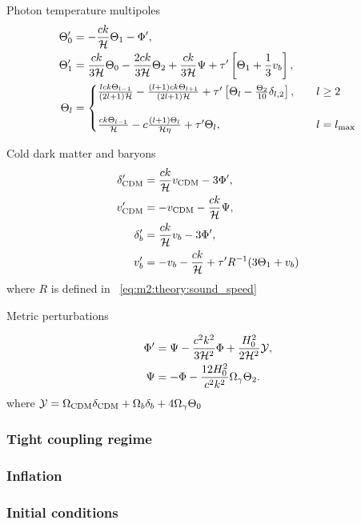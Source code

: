     
    Photon temperature multipoles
    \begin{subequations}\label{eq:m3:theory:photon_temp_multipoles}
        \begin{align}
            \Theta_0' &= -\frac{ck}{\mathcal{H}}\Theta_1-\Phi',\label{eq:m3:theory:photon_monopole}\\
            \Theta_1' &= \frac{ck}{3\mathcal{H}}\Theta_0 - \frac{2ck}{3\mathcal{H}}\Theta_2 +\frac{ck}{3\mathcal{H}}\Psi+\tau'\left[\Theta_1+\frac{1}{3}v_b\right],\label{eq:m3:theory:photon_dipole}\\
            \Theta_l &= \begin{cases}
                \frac{lck\Theta_{l-1}}{(2l+1)\mathcal{H}} -\frac{(l+1)ck\Theta_{l+1}}{(2l+1)\mathcal{H}} +\tau'\left[\Theta_l-\frac{\Theta_2}{10}\delta_{l,2}\right] , \quad &l\geq2\\
                \\
                \frac{ck\Theta_{l-1}}{\mathcal{H}} - c\frac{(l+1)\Theta_l}{\mathcal{H}\eta}+\tau'\Theta_l, &l=l_\mathrm{max}
            \end{cases}\label{eq:m3:theory:photon_multipole}
        \end{align}
    \end{subequations}


    
    Cold dark matter and baryons
    \begin{subequations}\label{eq:m3:theory:cdm_baryon_diffeqs}
        \begin{align}
            \delta'_{\text{CDM}} &= \frac{ck}{\mathcal{H}}v_{\text{CDM}}-3\Phi', \label{eq:m3:theory:delta_cdm}\\
            v'_{\text{CDM}} &= -v_{\text{CDM}}-\frac{ck}{\mathcal{H}}\Psi, \label{eq:m3:theory:v_cdm}\\
            \delta'_b &= \frac{ck}{\mathcal{H}}v_b - 3\Phi', \label{eq:m3:theory:delta_b}\\
            v'_b &= -v_b - \frac{ck}{\mathcal{H}} + \tau'R^{-1}(3\Theta_1+v_b) \label{eq:m3:theory:v_b}
        \end{align}
    \end{subequations}
    where $R$ is defined in ~\cref{eq:m2:theory:sound_speed}


    Metric perturbations

    \begin{subequations}\label{eq:m3:theory:metric_perturbations_final}
        \begin{align}
            \Phi' &= \Psi - \frac{c^2k^2}{3\mathcal{H}^2}\Phi + \frac{H_0^2}{2\mathcal{H}^2}\mathcal{Y}, \label{eq:m3:theory:phi_perturbation}\\
            \Psi &= -\Phi - \frac{12H_0^2}{c^2k^2}\Omega_\gamma\Theta_2. \label{eq:m3:theory:psi_perturbation}
        \end{align}
    \end{subequations}
    where $\mathcal{Y} = \Omega_{\text{CDM}}\delta_{\text{CDM}}+\Omega_b\delta_b+4\Omega_\gamma\Theta_0$

\subsubsection{Tight coupling regime}

\subsubsection{Inflation}
\subsubsection{Initial conditions}

